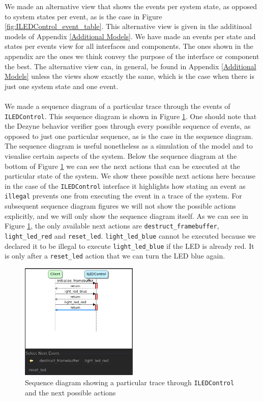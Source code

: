 \documentclass[12pt]{scrreprt}
\begin{document}
\begin{appendices}
We made an alternative view that shows the events per system state, as opposed to system states per event, as is the case in Figure \ref{fig:ILEDControl_event_table}. This alternative view is given in the additinoal models of Appendix \ref{Additional Models}. We have made an events per state and states per events view for all interfaces and components. The ones shown in the appendix are the ones we think convey the purpose of the interface or component the best. The alternative view can, in general, be found in Appendix \ref{Additional Models} unless the views show exactly the same, which is the case when there is just one system state and one event.
\\\\
We made a sequence diagram of a particular trace through the events of \texttt{ILEDControl}. This sequence diagram is shown in Figure \ref{fig:ILEDControl_seq}. One should note that the Dezyne behavior verifier goes through every possible sequence of events, as opposed to just one particular sequence, as is the case in the sequence diagram. The sequence diagram is useful nonetheless as a simulation of the model and to visualise certain aspects of the system. Below the sequence diagram at the bottom of Figure \ref{fig:ILEDControl_seq} we can see the next actions that can be executed at the particular state of the system. We show these possible next actions here because in the case of the \texttt{ILEDControl} interface it highlights how stating an event as \texttt{illegal} prevents one from executing the event in a trace of the system. For subsequent sequence diagram figures we will not show the possible actions explicitly, and we will only show the sequence diagram itself. As we can see in Figure \ref{fig:ILEDControl_seq}, the only available next actions are \texttt{destruct\_framebuffer}, \texttt{light\_led\_red} and \texttt{reset\_led}. \texttt{light\_led\_blue} cannot be executed because we declared it to be illegal to execute \texttt{light\_led\_blue} if the LED is already red. It is only after a \texttt{reset\_led} action that we can turn the LED blue again.

\begin{figure}[H]
    \centering
    \includegraphics[width=0.5\textwidth]{Figures/results/modelling_figures/ILEDControl/ILEDControl_seq_enhanced.png}
    \caption{Sequence diagram showing a particular trace through \texttt{ILEDControl} and the next possible actions}
    \label{fig:ILEDControl_seq}
\end{figure}


\end{appendices}
\end{document}
